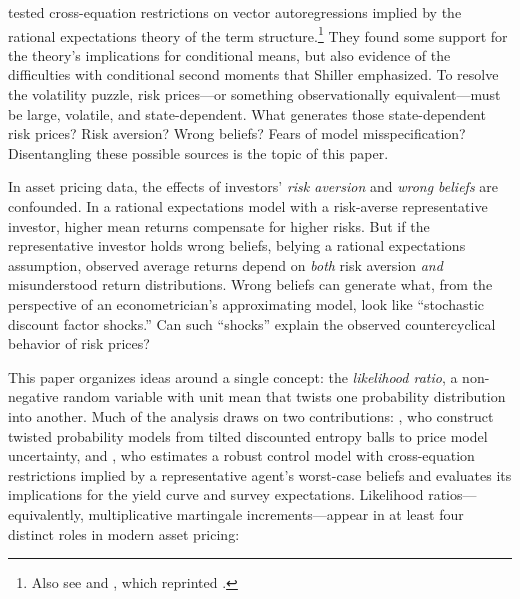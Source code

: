 \documentclass[12pt]{article}
\theoremstyle{definition}
\begin{document}
\citet{hansen1981exact} tested cross-equation restrictions on vector autoregressions implied by the rational expectations theory of the term structure.\footnote{Also see \citet{Sargent1972,Sargent1979} and \citet{HansenSargent1991}, which
reprinted \citet{hansen1981exact}.} They found some support for the theory's implications for conditional means, but also evidence of the difficulties with conditional second moments that Shiller emphasized. To resolve the volatility puzzle, risk prices---or something observationally equivalent---must be large, volatile, and state-dependent. What generates those state-dependent risk prices? Risk aversion? Wrong beliefs? Fears of model misspecification? Disentangling these possible sources is the topic of this paper.

In asset pricing data, the effects of investors' \emph{risk aversion} and \emph{wrong beliefs} are
confounded.  In a rational expectations model with a
risk-averse representative investor, higher mean returns compensate for
higher risks.  But if the representative investor holds wrong beliefs, belying a rational expectations assumption,
observed average returns depend on \emph{both} risk aversion \emph{and}
misunderstood return distributions.  Wrong beliefs can generate what, from the perspective of an econometrician's approximating model, look
like ``stochastic discount factor shocks.'' Can such ``shocks'' explain the observed countercyclical behavior of risk prices?


This paper organizes ideas around a single concept: the
\emph{likelihood ratio}, a non-negative random variable with unit mean
that twists one probability distribution into another.
Much of the analysis draws on two contributions:
\citet{HSHS2020}, who construct
twisted probability models from tilted discounted entropy balls to
price model uncertainty, and \citet{Szoke2022}, who estimates a
robust control model with cross-equation restrictions implied by a
representative agent's worst-case beliefs and evaluates its
implications for the yield curve and survey expectations.
Likelihood
ratios---equivalently, multiplicative martingale increments---appear in
at least four distinct roles in modern asset pricing:
\end{document}
